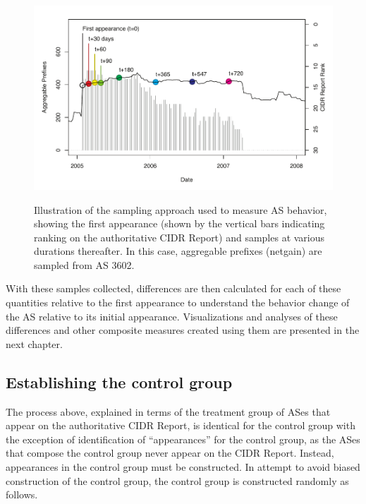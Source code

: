 \begin{figure}[t]
\begin{centering}
    \includegraphics[width=6in]{figures/single_as.pdf}
    \vspace{-2em}\\
    \caption[Illustration of the sampling approach used to measure AS
    behavior]{Illustration of the sampling approach used to measure AS
    behavior, showing the first appearance (shown by the vertical bars
    indicating ranking on the authoritative CIDR Report) and samples at various
    durations thereafter. In this case, aggregable prefixes (netgain) are
    sampled from AS 3602.}
    \label{fig:sample_ex}
\end{centering}
\end{figure}

With these samples collected, differences are then calculated for each of these
quantities relative to the first appearance to understand the behavior change
of the AS relative to its initial appearance. Visualizations and analyses of
these differences and other composite measures created using them are presented
in the next chapter.

\subsection{Establishing the control group}

The process above, explained in terms of the treatment group of ASes that
appear on the authoritative CIDR Report, is identical for the control group
with the exception of identification of ``appearances'' for the control group,
as the ASes that compose the control group never appear on the CIDR Report.
Instead, appearances in the control group must be constructed. In attempt to
avoid biased construction of the control group, the control group is
constructed randomly as follows.

